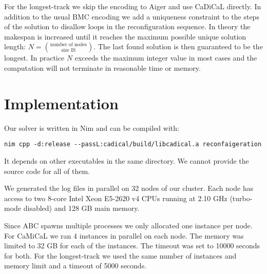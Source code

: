 \documentclass[11pt]{article}
\begin{document}
For the longest-track we skip the encoding to Aiger and use CaDiCaL directly. In addition to the usual BMC encoding we add a uniqueness constraint to the steps of the solution to disallow loops in the reconfiguration sequence. In theory the makespan is increased until it reaches the maximum possible unique solution length:
\(N = \binom{\text{number of nodes}}{\text{size IS}}.\)
The last found solution is then guaranteed to be the longest.
In practice \(N\) exceeds the maximum integer value in most cases and the computation will not terminate in reasonable time or memory.
\section*{Implementation}
\label{sec:orgaf79f39}
Our solver is written in Nim and can be compiled with:
\begin{verbatim}
nim cpp -d:release --passL:cadical/build/libcadical.a reconfaigeration
\end{verbatim}
It depends on other executables in the same directory. We cannot provide the source code for all of them.

We generated the log files
in parallel on 32 nodes of our cluster.
Each node has access to two 8-core Intel Xeon E5-2620 v4 CPUs running at 2.10 GHz
(turbo-mode disabled) and 128 GB main memory.

Since ABC spawns multiple processes we only allocated one instance per node. For CaMiCaL we ran 4 instances in parallel on each node. The memory was limited to 32 GB for each of the instances. The timeout was set to 10000 seconds for both.
For the longest-track we used the same number of instances and memory limit and a timeout of 5000 seconds.
\printbibliography
\end{document}
